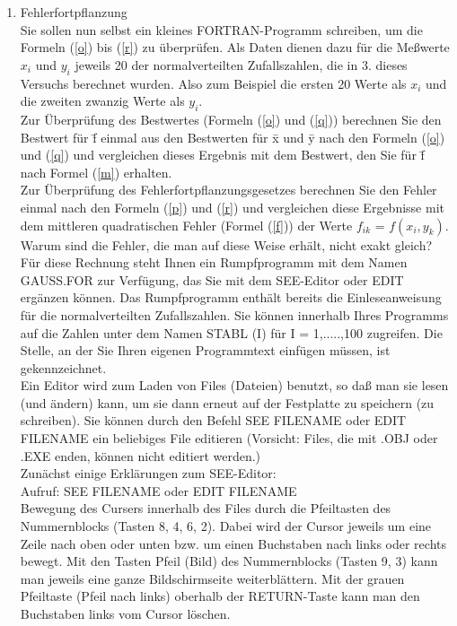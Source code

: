 \begin{enumerate}
\item Fehlerfortpflanzung\\
Sie sollen nun selbst ein kleines FORTRAN-Programm schreiben, um die
Formeln (\ref{o}) bis (\ref{r}) zu überprüfen. Als Daten dienen dazu
für die Meßwerte $x_{i}$ und $y_{i}$ jeweils 20 der normalverteilten
Zufallszahlen, die in 3. dieses Versuchs berechnet wurden. Also zum
Beispiel die ersten 20 Werte als $x_{i}$ und die zweiten zwanzig Werte
als $y_{i}$.\\ Zur Überprüfung des Bestwertes (Formeln (\ref{o}) und
(\ref{q})) berechnen Sie den Bestwert für \=f einmal aus den Bestwerten
für \=x und \=y nach den Formeln (\ref{o}) und (\ref{q}) und
vergleichen dieses Ergebnis mit dem Bestwert, den Sie für \=f nach
Formel (\ref{m}) erhalten.\\ Zur Überprüfung des
Fehlerfortpflanzungsgesetzes berechnen Sie den Fehler einmal nach den
Formeln (\ref{p}) und (\ref{r}) und vergleichen diese Ergebnisse mit
dem mittleren quadratischen Fehler (Formel (\ref{f})) der Werte
$f_{ik}$ = $f(x_{i},y_{k})$.\\

Warum sind die Fehler, die man auf diese Weise erhält, nicht exakt
gleich?\\

Für diese Rechnung steht Ihnen ein Rumpfprogramm mit dem Namen
GAUSS.FOR zur Verfügung, das Sie mit dem SEE-Editor oder EDIT
ergänzen können. Das Rumpfprogramm enthält bereits die
Einleseanweisung für die normalverteilten Zufallszahlen. Sie können
innerhalb Ihres Programms auf die Zahlen unter dem Namen STABL (I) für
I = 1,.....,100 zugreifen. Die Stelle, an der Sie Ihren eigenen
Programmtext einfügen müssen, ist gekennzeichnet.\\

Ein Editor wird zum Laden von Files (Dateien) benutzt, so daß man sie
lesen (und ändern) kann, um sie dann erneut auf der Festplatte zu
speichern (zu schreiben). Sie können durch den Befehl SEE FILENAME oder
EDIT FILENAME ein beliebiges File editieren (Vorsicht: Files, die mit
.OBJ oder .EXE enden, können nicht editiert werden.)\\

Zunächst einige Erklärungen zum SEE-Editor:\\

Aufruf: SEE FILENAME oder EDIT FILENAME \\

Bewegung des Cursers innerhalb des Files durch die Pfeiltasten des
Nummernblocks (Tasten 8, 4, 6, 2). Dabei wird der Cursor jeweils um
eine Zeile nach oben oder unten bzw. um einen Buchstaben nach links
oder rechts bewegt. Mit den Tasten Pfeil (Bild) des Nummernblocks
(Tasten 9, 3) kann man jeweils eine ganze Bildschirmseite
weiterblättern. Mit der grauen Pfeiltaste (Pfeil nach links) oberhalb
der RETURN-Taste kann man den Buchstaben links vom Cursor löschen.\\


\end{enumerate}

